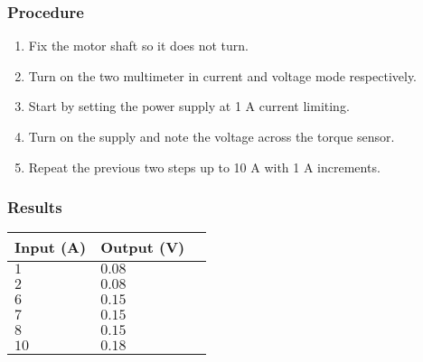 \subsubsection{Procedure}

\begin{enumerate}
  \item Fix the motor shaft so it does not turn.
  \item Turn on the two multimeter in current and voltage mode respectively.
  \item Start by setting the power supply at 1 A current limiting.
  \item Turn on the supply and note the voltage across the torque sensor.
  \item Repeat the previous two steps up to 10 A with 1 A increments.
\end{enumerate}

\subsubsection{Results}

\begin{table}[H]
\begin{tabular}{|l|l|l|}
\hline%
  \textbf{Input (A)}  & \textbf{Output (V)}  \\
\hline%
  $1$                 &            $0.08$    \\
\hline%
  $2$                 &            $0.08$    \\
\hline%
  $6$                 &            $0.15$    \\
\hline%
  $7$                 &            $0.15$    \\
\hline%
  $8$                 &            $0.15$    \\
\hline%
  $10$                &            $0.18$    \\
\hline%
\end{tabular}
\end{table}
